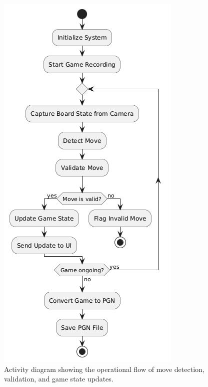 \begin{figure}[h!]
\begin{minipage}[t]{0.45\textwidth}
        \includegraphics[width=\linewidth]{figures/results/uml/activity-2.png}
        \caption[Activity Diagram]{Activity diagram showing the operational flow of move detection, validation, and game state updates.}
        \label{fig:activity}
    \end{minipage}
\end{figure}

